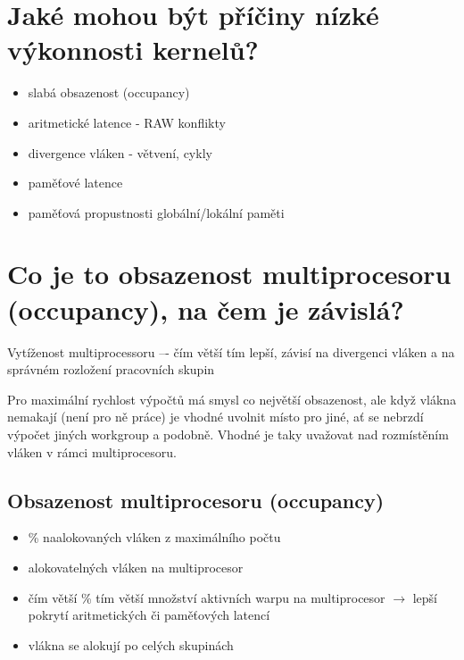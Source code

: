 \section{Jaké mohou být příčiny nízké výkonnosti kernelů?}
	\begin{itemize}
		\setlength\itemsep{0em}
		\item slabá obsazenost (occupancy)
		\item aritmetické latence - RAW konflikty
		\item divergence vláken - větvení, cykly
		\item paměťové latence
		\item paměťová propustnosti globální/lokální paměti
	\end{itemize}


\section{Co je to obsazenost multiprocesoru (occupancy), na čem je závislá?}
	Vytíženost multiprocessoru –- čím větší tím lepší, závisí na divergenci vláken a na správném rozložení pracovních skupin
	
	Pro maximální rychlost výpočtů má smysl co největší obsazenost, ale když vlákna nemakají (není pro ně práce) je vhodné uvolnit místo pro jiné, ať se nebrzdí výpočet jiných workgroup a podobně. Vhodné je taky uvažovat nad rozmístěním vláken v rámci multiprocesoru.

	\subsection*{Obsazenost multiprocesoru (occupancy)}
		\begin{itemize}
			\setlength\itemsep{0em}
			\item \% naalokovaných vláken z maximálního počtu
			\item alokovatelných vláken na multiprocesor
			\item čím větší \% tím větší množství aktivních warpu na multiprocesor $\rightarrow$ lepší pokrytí aritmetických či paměťových latencí
			\item vlákna se alokují po celých skupinách
		\end{itemize}
	
